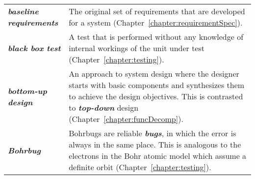 \begin{longtable} { p{4cm} p{11cm}}
\emph{\textbf{baseline requirements}} & The original set of requirements
that are developed for a system (Chapter~\ref{chapter:requirementSpec}). \\

\emph{\textbf{black box test}} & A test that is performed without any
knowledge of internal workings of the unit under test (Chapter~\ref{chapter:testing}). \\

\emph{\textbf{bottom-up design}} & An approach to system design where
the designer starts with basic components and synthesizes them to
achieve the design objectives. This is contrasted to
\emph{\textbf{top-down}} design (Chapter~\ref{chapter:funcDecomp}). \\

\emph{\textbf{Bohrbug}} & Bohrbugs are reliable \emph{\textbf{bugs}}, in
which the error is always in the same place. This is analogous to the
electrons in the Bohr atomic model which assume a definite orbit
(Chapter~\ref{chapter:testing}). \\


\end{longtable}
